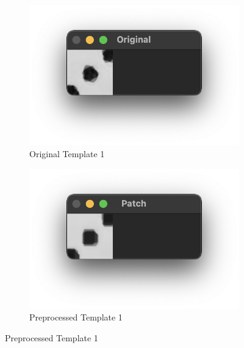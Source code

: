 \documentclass[12pt]{article}
\begin{document}
    \begin{figure}[!h]
        \centering
        \label{fig:templates-preprocessing}
        \begin{subfigure}{.5\textwidth}
            \centering
            \includegraphics[width=0.9\linewidth]{images/templates_no_preprocess/vertical/3.png}
            \caption{Original Template 1}
            \label{fig:ot-1}
        \end{subfigure}%
        \begin{subfigure}{.5\textwidth}
            \centering
            \includegraphics[width=0.9\linewidth]
            {images/templates_preprocess/vertical/3.png}
            \caption{Preprocessed Template 1}
            \label{fig:pt-1}
        \end{subfigure}
    \end{figure}
\end{document}
